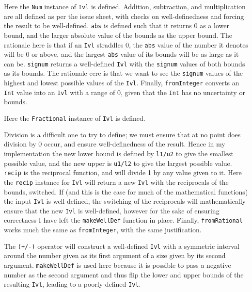 \documentclass[11pt]{article}
\begin{document}
Here the \verb|Num| instance of \verb|Ivl| is defined.
Addition, subtraction, and multiplication are all defined as per the issue sheet, with checks on well-definedness and forcing the result to be well-defined.
\verb|abs| is defined such that it returns 0 as a lower bound, and the larger absolute value of the bounds as the upper bound.
The rationale here is that if an \verb|Ivl| straddles 0, the \verb|abs| value of the number it denotes will be 0 or above, and the largest \verb|abs| value of its bounds will be as large as it can be.
\verb|signum| returns a well-defined \verb|Ivl| with the \verb|signum| values of both bounds as its bounds.
The rationale eere is that we want to see the \verb|signum| values of the highest and lowest possible values of the \verb|Ivl|.
Finally, \verb|fromInteger| converts an \verb|Int| value into an \verb|Ivl| with a range of 0, given that the \verb|Int| has no uncertainty or bounds.



Here the \verb|Fractional| instance of \verb|Ivl| is defined.

Division is a difficult one to try to define; we must ensure that at no point does division by 0 occur, and ensure well-definedness of the result.
Hence in my implementation the new lower bound is defined by \verb|l1/u2| to give the smallest possible value, and the new upper is \verb|u1/l2| to give the largest possible value.
\verb|recip| is the reciprocal function, and will divide 1 by any value given to it.
Here the \verb|recip| instance for \verb|Ivl| will return a new \verb|Ivl| with the reciprocals of the bounds, switched.
If (and this is the case for much of the mathematical functions) the input \verb|Ivl| is well-defined, the switching of the reciprocals will mathematically ensure that the new \verb|Ivl| is well-defined, however for the sake of ensuring correctness I have left the \verb|makeWellDef| function in place.
Finally, \verb|fromRational| works much the same as \verb|fromInteger|, with the same justification.



The \verb|(+/-)| operator will construct a well-defined \verb|Ivl| with a symmetric interval around the number given as its first argument of a size given by its second argument.
\verb|makeWellDef| is used here because it is possible to pass a negative number as the second argument and thus flip the lower and upper bounds of the resulting \verb|Ivl|, leading to a poorly-defined \verb|Ivl|.
\end{document}
